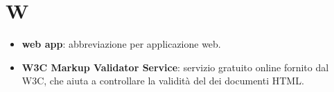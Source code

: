 \section{W}
\begin{itemize}
	\item \textbf{web app}: abbreviazione per applicazione web.
	\item \textbf{W3C Markup Validator Service}: servizio gratuito online fornito dal W3C, che aiuta a controllare la validità del dei documenti HTML.
\end{itemize}
